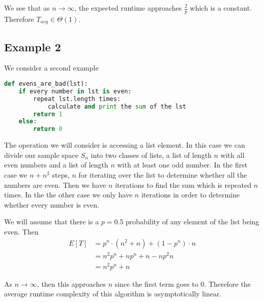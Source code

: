 We see that as $n \to \infty$, the expected runtime approaches $\frac{2}{p}$ which is a constant. Therefore $T_{avg} \in \Theta(1)$.

\subsection{Example 2}
We consider a second example
\begin{lstlisting}[language=Python]
def evens_are_bad(lst):
    if every number in lst is even:
        repeat lst.length times:
            calculate and print the sum of the lst
        return 1
    else:
        return 0
\end{lstlisting}
The operation we will consider is accessing a list element.
In this case we can divide our sample space $S_n$ into two classes of lists, a list of length $n$ with all even numbers and a list of length $n$ with at least one odd number. In the first case we $n + n^2$ steps, $n$ for iterating over the list to determine whether all the numbers are even. Then we have $n$ iterations to find the sum which is repeated $n$ times. In the the other case we only have $n$ iterations in order to determine whether every number is even.

We will assume that there is a $p = 0.5$ probability of any element of the list being even. Then
\begin{align*}
    E[T] &= p^n \cdot (n^2 + n) + (1 - p^n) \cdot n\\
    &= n^2 p^n + np^n + n - n p^2n\\
    &= n^2 p^n + n
\end{align*}

As $n \to \infty$, then this approaches $n$ since the first term goes to 0. Therefore the average runtime complexity of this algorithm is asymptotically linear.